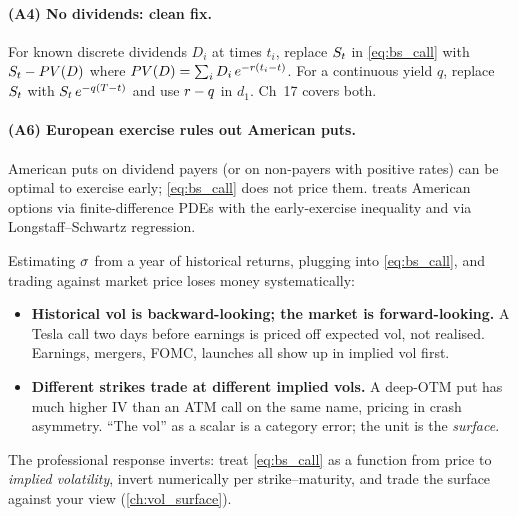 \paragraph{(A4) No dividends: clean fix.}
For known discrete dividends $D_i$ at times $t_i$, replace
$S_t$ in \eqref{eq:bs_call} with $S_t - PV(D)$ where
$PV(D) = \sum_i D_i\,e^{-r(t_i - t)}$. For a continuous yield
$q$, replace $S_t$ with $S_t\,e^{-q(T - t)}$ and use
$r - q$ in $d_1$. \citeHull{} Ch~17 covers both.

\paragraph{(A6) European exercise rules out American puts.}
American puts on dividend payers (or on non-payers with positive
rates) can be optimal to exercise early; \eqref{eq:bs_call} does
not price them.  treats American
options via finite-difference PDEs with the early-exercise
inequality and via Longstaff--Schwartz regression.

\begin{pitfallbox}
Estimating $\sigma$ from a year of historical returns, plugging
into \eqref{eq:bs_call}, and trading against market price loses
money systematically:
\begin{itemize}
  \item \textbf{Historical vol is backward-looking; the market
  is forward-looking.} A Tesla call two days before earnings is
  priced off expected vol, not realised. Earnings, mergers,
  FOMC, launches all show up in implied vol first.
  \item \textbf{Different strikes trade at different implied
  vols.} A deep-OTM put has much higher IV than an ATM call on
  the same name, pricing in crash asymmetry. ``The vol'' as a
  scalar is a category error; the unit is the \emph{surface}.
\end{itemize}
The professional response inverts: treat \eqref{eq:bs_call} as a
function from price to \emph{implied volatility}, invert
numerically per strike--maturity, and trade the surface against
your view (\cref{ch:vol_surface}).
\end{pitfallbox}

